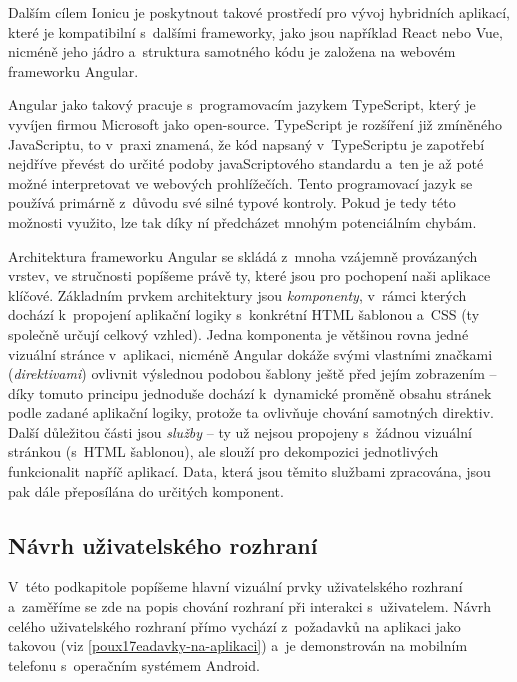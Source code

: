 Dalším cílem Ionicu je poskytnout takové prostředí pro vývoj hybridních
aplikací, které je kompatibilní s~dalšími frameworky, jako jsou
například React nebo Vue, nicméně jeho jádro a~struktura samotného kódu
je založena na webovém frameworku Angular.~\parencite{ionic}

Angular jako takový pracuje s~programovacím jazykem TypeScript, který je
vyvíjen firmou Microsoft jako open-source. TypeScript je rozšíření již
zmíněného JavaScriptu, to v~praxi znamená, že kód napsaný v~TypeScriptu
je zapotřebí nejdříve převést do určité podoby javaScriptového standardu
a~ten je až poté možné interpretovat ve webových prohlížečích. Tento
programovací jazyk se používá primárně z~důvodu své silné typové
kontroly. Pokud je tedy této možnosti využito, lze tak díky ní
předcházet mnohým potenciálním chybám.~\parencite{typescript}

Architektura frameworku Angular se skládá z~mnoha vzájemně provázaných
vrstev, ve stručnosti popíšeme právě ty, které jsou pro pochopení naši
aplikace klíčové. Základním prvkem architektury jsou \emph{komponenty},
v~rámci kterých dochází k~propojení aplikační logiky s~konkrétní HTML
šablonou a~CSS (ty společně určují celkový vzhled). Jedna komponenta je
většinou rovna jedné vizuální stránce v~aplikaci, nicméně Angular dokáže
svými vlastními značkami (\emph{direktivami}) ovlivnit výslednou podobou
šablony ještě před jejím zobrazením -- díky tomuto principu jednoduše
dochází k~dynamické proměně obsahu stránek podle zadané aplikační
logiky, protože ta ovlivňuje chování samotných direktiv. Další důležitou
části jsou \emph{služby} -- ty už nejsou propojeny s~žádnou vizuální
stránkou (s~HTML šablonou), ale slouží pro dekompozici jednotlivých
funkcionalit napříč aplikací. Data, která jsou těmito službami
zpracována, jsou pak dále přeposílána do určitých komponent.
\parencite{angulararchitecture}

\hypertarget{nuxe1vrh-uux17eivatelskuxe9ho-rozhranuxed}{%
\subsection{Návrh uživatelského
rozhraní}\label{nuxe1vrh-uux17eivatelskuxe9ho-rozhranuxed}}

V~této podkapitole popíšeme hlavní vizuální prvky uživatelského rozhraní
a~zaměříme se zde na popis chování rozhraní při interakci s~uživatelem.
Návrh celého uživatelského rozhraní přímo vychází z~požadavků na
aplikaci jako takovou (viz \ref{poux17eadavky-na-aplikaci}) a~je
demonstrován na mobilním telefonu s~operačním systémem Android.

